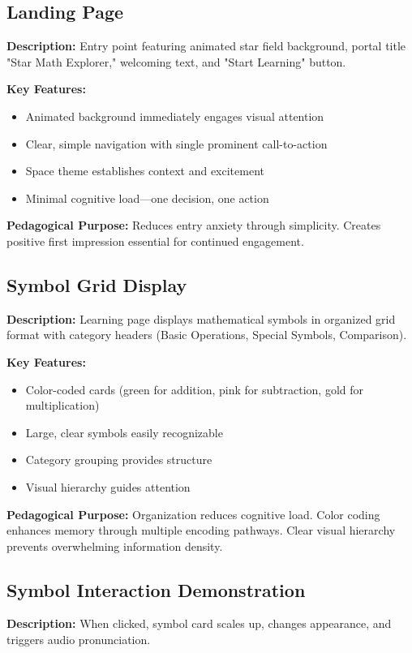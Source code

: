 \documentclass[11pt, a4paper]{article}
\begin{document}
\subsection{Landing Page}
\textbf{Description:} Entry point featuring animated star field background, portal title "Star Math Explorer," welcoming text, and "Start Learning" button.

\textbf{Key Features:}
\begin{itemize}[leftmargin=*, noitemsep]
    \item Animated background immediately engages visual attention
    \item Clear, simple navigation with single prominent call-to-action
    \item Space theme establishes context and excitement
    \item Minimal cognitive load—one decision, one action
\end{itemize}

\textbf{Pedagogical Purpose:} Reduces entry anxiety through simplicity. Creates positive first impression essential for continued engagement.

\subsection{Symbol Grid Display}
\textbf{Description:} Learning page displays mathematical symbols in organized grid format with category headers (Basic Operations, Special Symbols, Comparison).

\textbf{Key Features:}
\begin{itemize}[leftmargin=*, noitemsep]
    \item Color-coded cards (green for addition, pink for subtraction, gold for multiplication)
    \item Large, clear symbols easily recognizable
    \item Category grouping provides structure
    \item Visual hierarchy guides attention
\end{itemize}

\textbf{Pedagogical Purpose:} Organization reduces cognitive load. Color coding enhances memory through multiple encoding pathways. Clear visual hierarchy prevents overwhelming information density.

\subsection{Symbol Interaction Demonstration}
\textbf{Description:} When clicked, symbol card scales up, changes appearance, and triggers audio pronunciation.
\end{document}
